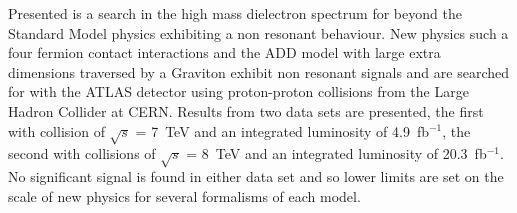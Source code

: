 

Presented is a search in the high mass dielectron spectrum for beyond the Standard Model physics exhibiting a non resonant behaviour. New physics such a four fermion contact interactions and the ADD model with large extra dimensions traversed by a Graviton exhibit non resonant signals and are searched for with the ATLAS detector using proton-proton collisions from the Large Hadron Collider at CERN. Results from two data sets are presented, the first with collision of $\sqrt{s}$ = 7~TeV and an integrated luminosity of 4.9~fb$^{-1}$, the second with collisions of $\sqrt{s}$ = 8~TeV and an integrated luminosity of 20.3~fb$^{-1}$. 
No significant signal is found in either data set and so lower limits are set on the scale of new physics for several formalisms of each model. 




